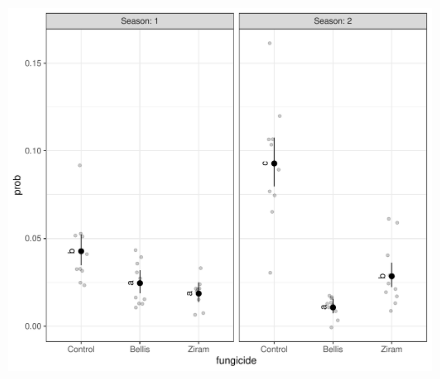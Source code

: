 \documentclass[
  letterpaper,
  DIV=11,
  numbers=noendperiod]{scrreport}
\begin{document}
\begin{figure}[H]

{\centering \includegraphics{in_field_files/figure-pdf/unnamed-chunk-8-1.pdf}

}

\end{figure}
\end{document}
